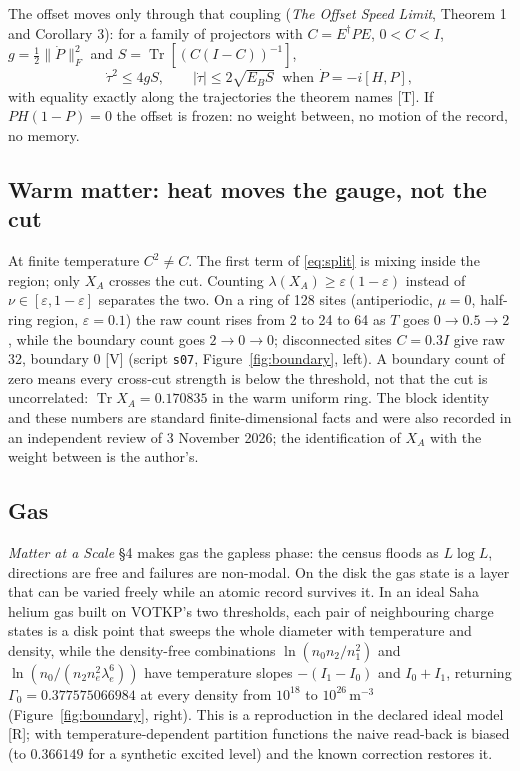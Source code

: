 \documentclass[11pt]{article}
\theoremstyle{definition}
\newcommand{\grade}[1]{\textsf{\small[#1]}}
\newcommand{\Tr}{\operatorname{Tr}}
\begin{document}
The offset moves only through that coupling (\emph{The Offset Speed Limit}, Theorem 1 and Corollary 3): for a family of projectors with $C=E^\dagger PE$, $0<C<I$, $g=\tfrac12\|\dot P\|_F^2$ and $S=\Tr[(C(I-C))^{-1}]$,
\begin{equation}
\dot\tau^2\le4gS,\qquad |\dot\tau|\le2\sqrt{E_BS}\ \text{ when }\dot P=-i[H,P],
\end{equation}
with equality exactly along the trajectories the theorem names \grade{T}. If $PH(1-P)=0$ the offset is frozen: no weight between, no motion of the record, no memory.

\subsection{Warm matter: heat moves the gauge, not the cut}
At finite temperature $C^2\neq C$. The first term of \eqref{eq:split} is mixing inside the region; only $X_A$ crosses the cut. Counting $\lambda(X_A)\ge\varepsilon(1-\varepsilon)$ instead of $\nu\in[\varepsilon,1-\varepsilon]$ separates the two. On a ring of 128 sites (antiperiodic, $\mu=0$, half-ring region, $\varepsilon=0.1$) the raw count rises from 2 to 24 to 64 as $T$ goes $0\to0.5\to2$, while the boundary count goes $2\to0\to0$; disconnected sites $C=0.3I$ give raw 32, boundary 0 \grade{V} (script \texttt{s07}, Figure~\ref{fig:boundary}, left). A boundary count of zero means every cross-cut strength is below the threshold, not that the cut is uncorrelated: $\Tr X_A=0.170835$ in the warm uniform ring. The block identity and these numbers are standard finite-dimensional facts and were also recorded in an independent review of 3 November 2026; the identification of $X_A$ with the weight between is the author's.

\subsection{Gas}
\emph{Matter at a Scale} §4 makes gas the gapless phase: the census floods as $L\log L$, directions are free and failures are non-modal. On the disk the gas state is a layer that can be varied freely while an atomic record survives it. In an ideal Saha helium gas built on VOTKP's two thresholds, each pair of neighbouring charge states is a disk point that sweeps the whole diameter with temperature and density, while the density-free combinations $\ln(n_0n_2/n_1^2)$ and $\ln(n_0/(n_2n_e^2\lambda_e^6))$ have temperature slopes $-(I_1-I_0)$ and $I_0+I_1$, returning $\Gamma_0=0.377575066984$ at every density from $10^{18}$ to $10^{26}\,\mathrm{m^{-3}}$ (Figure~\ref{fig:boundary}, right). This is a reproduction in the declared ideal model \grade{R}; with temperature-dependent partition functions the naive read-back is biased (to $0.366149$ for a synthetic excited level) and the known correction restores it.
\end{document}
